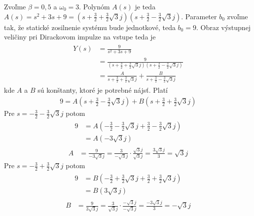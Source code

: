 \documentclass[a4paper, 10pt, ]{article}
\begin{document}
Zvoľme $\beta = 0,5$ a $\omega_0 = 3$. Polynóm $A(s)$ je teda $A(s) = s^2 + 3s + 9 = \left( s + \frac{3}{2} + \frac{3}{2} \sqrt{3} j \right) \left( s + \frac{3}{2} - \frac{3}{2} \sqrt{3} j \right) $. Parameter $b_0$ zvoľme tak, že statické zosilnenie systému bude jednotkové, teda $b_0 = 9$. Obraz výstupnej veličiny pri Dirackovom impulze na vstupe teda je
\begin{align}
    \begin{aligned}
        Y(s) &= \frac{9}{s^2 + 3s + 9} \\
        &= \frac{9}{\left( s + \frac{3}{2} + \frac{3}{2} \sqrt{3} j \right) \left( s + \frac{3}{2} - \frac{3}{2} \sqrt{3} j \right)} \\
        &= \frac{A}{s + \frac{3}{2} + \frac{3}{2} \sqrt{3} j} + \frac{B}{s + \frac{3}{2} - \frac{3}{2} \sqrt{3} j}
    \end{aligned}
\end{align}
kde $A$ a $B$ sú konštanty, ktoré je potrebné nájsť. Platí
\begin{align}
    9 = A \left( s + \frac{3}{2} - \frac{3}{2} \sqrt{3} j \right) + B \left( s + \frac{3}{2} + \frac{3}{2} \sqrt{3} j \right)
\end{align}
Pre $s = - \frac{3}{2} - \frac{3}{2} \sqrt{3} j$ potom
\begin{align}
    \begin{aligned}
        9 &= A \left( - \frac{3}{2} - \frac{3}{2} \sqrt{3} j + \frac{3}{2} - \frac{3}{2} \sqrt{3} j \right) \\
        &= A \left( - 3 \sqrt{3} j   \right) 
    \end{aligned} 
\end{align}
\begin{align}    
        A &= \frac{9}{- 3 \sqrt{3} j} = \frac{3}{-  \sqrt{3} j} \cdot \frac{\sqrt{3} j}{\sqrt{3} j} = \frac{3 \sqrt{3} j}{3} = \sqrt{3} j
\end{align}
Pre $s = - \frac{3}{2} + \frac{3}{2} \sqrt{3} j$ potom
\begin{align}
    \begin{aligned}
        9 &= B \left( - \frac{3}{2} + \frac{3}{2} \sqrt{3} j + \frac{3}{2} + \frac{3}{2} \sqrt{3} j \right) \\
        &= B \left(  3 \sqrt{3} j   \right) 
    \end{aligned} 
\end{align}
\begin{align}    
    B &= \frac{9}{ 3 \sqrt{3} j} = \frac{3}{  \sqrt{3} j} \cdot \frac{-\sqrt{3} j}{-\sqrt{3} j} = \frac{-3 \sqrt{3} j}{3} = -\sqrt{3} j
\end{align}
\end{document}
